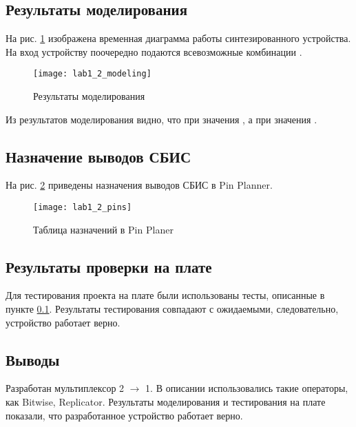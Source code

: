 \subsection{Результаты моделирования}
\label{sec:lab1_2_modeling}

На рис. \ref{fig:lab1_2_modeling} изображена временная диаграмма работы синтезированного устройства. На вход устройству поочередно подаются всевозможные комбинации .
\begin{figure}[H]
\begin{center}
	\texttt{[image: lab1\_2\_modeling]}
	\caption{Результаты моделирования}
	\label{fig:lab1_2_modeling}
\end{center}
\end{figure}
Из результатов моделирования видно, что при  значения , а при  значения .

\subsection{Назначение выводов СБИС}

На рис. \ref{fig:lab1_2_pins} приведены назначения выводов СБИС в Pin Planner.

\begin{figure}[H]
\begin{center}
	\texttt{[image: lab1\_2\_pins]}
	\caption{Таблица назначений в Pin Planer}
	\label{fig:lab1_2_pins}
\end{center}
\end{figure}

\subsection{Результаты проверки на плате}

Для тестирования проекта на плате были использованы тесты, описанные в пункте \ref{sec:lab1_2_modeling}. Результаты тестирования совпадают с ожидаемыми, следовательно, устройство работает верно.

\subsection{Выводы}

Разработан мультиплексор 2 $\rightarrow$ 1. В описании использовались такие операторы, как Bitwise, Replicator. Результаты моделирования и тестирования на плате показали, что разработанное устройство работает верно.

